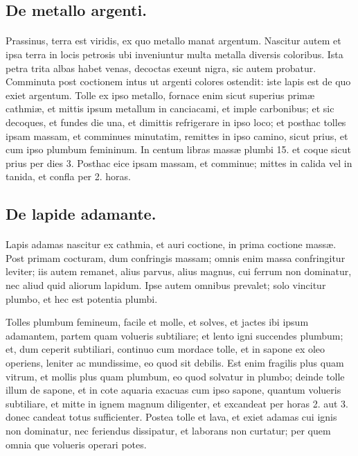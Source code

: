 \documentclass[a4paper, 11pt, oneside, polutonikogreek, italian]{article}
\begin{document}
\subsection{De metallo argenti.}
\paragraph{}
Prassinus, terra est viridis, ex quo metallo manat argentum. Nascitur autem et ipsa terra in locis petrosis ubi inveniuntur multa metalla diversis coloribus. Ista petra trita albas habet venas, decoctas exeunt nigra, sic autem probatur. Comminuta post coctionem intus ut argenti colores ostendit: iste lapis est de quo exiet argentum. Tolle ex ipso metallo, fornace enim sicut superius primæ cathmiæ, et mittis ipsum metallum in canciacami, et imple carbonibus; et sic decoques, et fundes die una, et dimittis refrigerare in ipso loco; et posthac tolles ipsam massam, et comminues minutatim, remittes in ipso camino, sicut prius, et cum ipso plumbum femininum. In centum libras massæ plumbi 15. et coque sicut prius per dies 3. Posthac eice ipsam massam, et comminue; mittes in calida vel in tanida, et confla per 2. horas.

\subsection{De lapide adamante.}
\paragraph{}
Lapis adamas nascitur ex cathmia, et auri coctione, in prima coctione massæ. Post primam cocturam, dum confringis massam; omnis enim massa confringitur leviter; iis autem remanet, alius parvus, alius magnus, cui ferrum non dominatur, nec aliud quid aliorum lapidum. Ipse autem omnibus prevalet; solo vincitur plumbo, et hec est potentia plumbi.

Tolles plumbum femineum, facile et molle, et solves, et jactes ibi ipsum adamantem, partem quam volueris subtiliare; et lento igni succendes plumbum; et, dum ceperit subtiliari, continuo cum mordace tolle, et in sapone ex oleo operiens, leniter ac mundissime, eo quod sit debilis. Est enim fragilis plus quam vitrum, et mollis plus quam plumbum, eo quod solvatur in plumbo; deinde tolle illum de sapone, et in cote aquaria exacuas cum ipso sapone, quantum volueris subtiliare, et mitte in ignem magnum diligenter, et excandeat per horas 2. aut 3. donec candeat totus sufficienter. Postea tolle et lava, et exiet adamas cui ignis non dominatur, nec feriendus dissipatur, et laborans non curtatur; per quem omnia que volueris operari potes.
\end{document}
